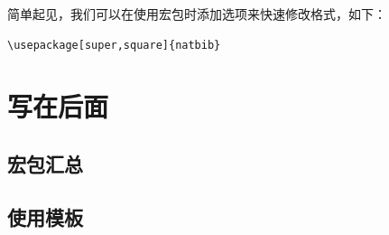 \documentclass{ctexart}
\numberwithin{equation}{section}			%
\begin{document}
	简单起见，我们可以在使用宏包时添加选项来快速修改格式，如下：
	
\begin{lstlisting}
\usepackage[super,square]{natbib}
\end{lstlisting}
		
	\section{写在后面}
	\subsection{宏包汇总}
	
	\subsection{使用模板}
	
	
	
\end{document}
